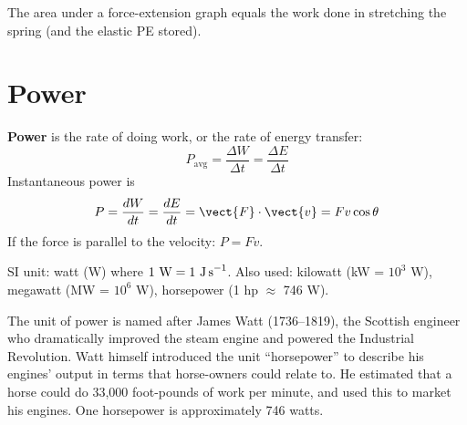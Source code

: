 \begin{diagbox}
\begin{center}
\end{center}
\small The area under a force-extension graph equals
the work done in stretching the spring (and the elastic PE stored).
\end{diagbox}

\section{Power}

\begin{definitionbox}[Power]
\textbf{Power} is the rate of doing work, or the rate
of energy transfer:
\[
  P_{\mathrm{avg}} = \frac{\Delta W}{\Delta t}
  = \frac{\Delta E}{\Delta t}
\]
Instantaneous power is
\[
  P = \frac{dW}{dt} = \frac{dE}{dt}
  = \vect{F}\cdot\vect{v} = Fv\cos\theta
\]
If the force is parallel to the velocity:
$P = Fv$.

SI unit: watt (W) where $1\ \text{W} = 1\ \text{J\,s}^{-1}$.
Also used: kilowatt (kW = $10^3$ W),
megawatt (MW = $10^6$ W), horsepower (1 hp $\approx$ 746 W).
\end{definitionbox}

\begin{historybox}
The unit of power is named after James Watt (1736--1819),
the Scottish engineer who dramatically improved the steam
engine and powered the Industrial Revolution. Watt
himself introduced the unit ``horsepower'' to describe
his engines' output in terms that horse-owners could
relate to. He estimated that a horse could do
33,000 foot-pounds of work per minute, and used this
to market his engines. One horsepower is approximately
746 watts.
\end{historybox}

